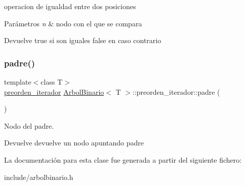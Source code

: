 operacion de igualdad entre dos posiciones 


\begin{DoxyParams}{Parámetros}
{\em n} & nodo con el que se compara \\
\hline
\end{DoxyParams}
\begin{DoxyReturn}{Devuelve}
true si son iguales false en caso contrario 
\end{DoxyReturn}
\mbox{\label{classArbolBinario_1_1preorden__iterador_ab4313745be1b076ee9ddadead9a9f31c}} 
\subsubsection{\texorpdfstring{padre()}{padre()}}
{\footnotesize\ttfamily template$<$class T$>$ \\
\hyperlink{classArbolBinario_1_1preorden__iterador}{preorden\+\_\+iterador} \hyperlink{classArbolBinario}{Arbol\+Binario}$<$ T $>$\+::preorden\+\_\+iterador\+::padre (\begin{DoxyParamCaption}{ }\end{DoxyParamCaption})\hspace{0.3cm}{\ttfamily [inline]}}



Nodo del padre. 

\begin{DoxyReturn}{Devuelve}
devuelve un nodo apuntando padre 
\end{DoxyReturn}


La documentación para esta clase fue generada a partir del siguiente fichero\+:\begin{DoxyCompactItemize}
\item 
include/arbolbinario.\+h\end{DoxyCompactItemize}
